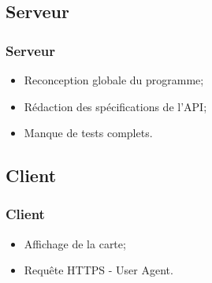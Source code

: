 \subsection{Serveur}
	\begin{frame}
		\frametitle{Serveur}
        \begin{itemize}
            \item Reconception globale du programme; \newline
            \item Rédaction des spécifications de l'API; \newline
            \item Manque de tests complets. \newline
        \end{itemize}
	\end{frame}

\subsection{Client}
	\begin{frame}
		\frametitle{Client}
		\begin{itemize}
			\item Affichage de la carte; \newline
			\item Requête HTTPS - User Agent.
		\end{itemize}
	\end{frame}

